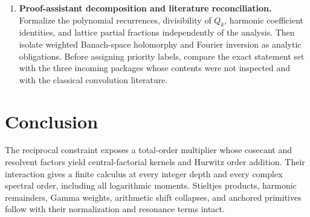 \documentclass[11pt,a4paper]{article}
\numberwithin{equation}{section}
\theoremstyle{definition}\newtheorem{definition}[theorem]{Definition}
\theoremstyle{remark}\newtheorem{remark}[theorem]{Remark}
\begin{document}
\begin{enumerate}[label=\textbf{Q\arabic*.},leftmargin=2.8em,itemsep=8pt]
\item \textbf{Proof-assistant decomposition and literature reconciliation.}
Formalize the polynomial recurrences, divisibility of $Q_k$, harmonic
coefficient identities, and lattice partial fractions independently of
the analysis. Then isolate weighted Banach-space holomorphy and Fourier
inversion as analytic obligations. Before assigning priority labels,
compare the exact statement set with the three incoming packages whose
contents were not inspected and with the classical convolution
literature.
\end{enumerate}

\section*{Conclusion}
The reciprocal constraint exposes a total-order multiplier whose
cosecant and resolvent factors yield central-factorial kernels and
Hurwitz order addition. Their interaction gives a finite calculus at
every integer depth and every complex spectral order, including all
logarithmic moments. Stieltjes products, harmonic remainders, Gamma
weights, arithmetic shift collapses, and anchored primitives follow
with their normalization and resonance terms intact.

\end{document}

